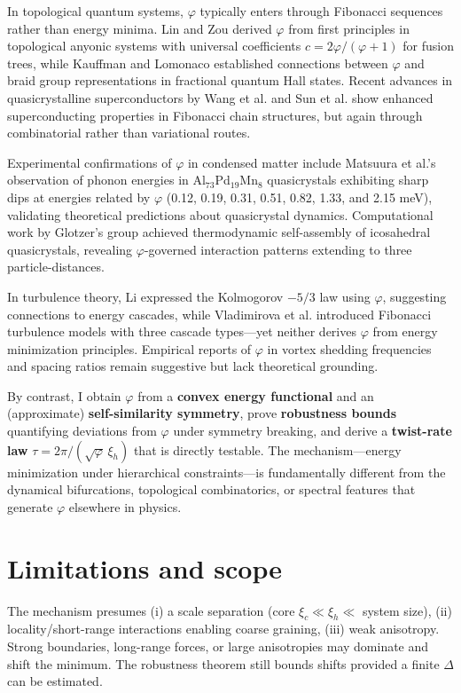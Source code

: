 \documentclass[11pt]{article}
\theoremstyle{remark}
\theoremstyle{definition}
\newcommand{\ph}{\varphi}
\begin{document}
In topological quantum systems, $\ph$ typically enters through Fibonacci sequences rather than energy minima. Lin and Zou \cite{lin2021} derived $\ph$ from first principles in topological anyonic systems with universal coefficients $c=2\ph/(\ph+1)$ for fusion trees, while Kauffman and Lomonaco \cite{kauffman2004} established connections between $\ph$ and braid group representations in fractional quantum Hall states. Recent advances in quasicrystalline superconductors by Wang et al. \cite{wang2024} and Sun et al. \cite{sun2023} show enhanced superconducting properties in Fibonacci chain structures, but again through combinatorial rather than variational routes.

Experimental confirmations of $\ph$ in condensed matter include Matsuura et al.'s \cite{matsuura2024} observation of phonon energies in Al$_{73}$Pd$_{19}$Mn$_8$ quasicrystals exhibiting sharp dips at energies related by $\ph$ (0.12, 0.19, 0.31, 0.51, 0.82, 1.33, and 2.15 meV), validating theoretical predictions about quasicrystal dynamics. Computational work by Glotzer's group \cite{glotzer2015} achieved thermodynamic self-assembly of icosahedral quasicrystals, revealing $\ph$-governed interaction patterns extending to three particle-distances.

In turbulence theory, Li \cite{li2013} expressed the Kolmogorov $-5/3$ law using $\ph$, suggesting connections to energy cascades, while Vladimirova et al. \cite{vladimirova2021} introduced Fibonacci turbulence models with three cascade types---yet neither derives $\ph$ from energy minimization principles. Empirical reports of $\ph$ in vortex shedding frequencies \cite{schewe1983} and spacing ratios remain suggestive but lack theoretical grounding.

By contrast, I obtain $\ph$ from a \textbf{convex energy functional} and an (approximate) \textbf{self-similarity symmetry}, prove \textbf{robustness bounds} quantifying deviations from $\ph$ under symmetry breaking, and derive a \textbf{twist-rate law} $\tau=2\pi/(\sqrt{\ph}\,\xi_h)$ that is directly testable. The mechanism---energy minimization under hierarchical constraints---is fundamentally different from the dynamical bifurcations, topological combinatorics, or spectral features that generate $\ph$ elsewhere in physics.

\section{Limitations and scope}
The mechanism presumes (i) a scale separation (core $\xi_c\ll\xi_h\ll$ system size), (ii) locality/short-range interactions enabling coarse graining, (iii) weak anisotropy. Strong boundaries, long-range forces, or large anisotropies may dominate and shift the minimum. The robustness theorem still bounds shifts provided a finite $\Delta$ can be estimated.
\end{document}
